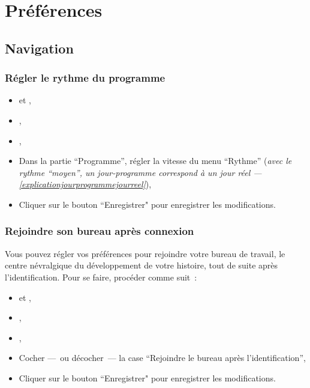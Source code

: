 \chapter{Préférences} %
\label{cha:preferences}

\section{Navigation} %
\label{sec:navigation}


\subsection{Régler le rythme du programme }
\label{sub:reglerlerythmeduprogramme}

\begin{itemize}
  \item \rejoindreLeSite{} et \seConnecter{},
  \item \rejoindreBureau{},
  \item {},
  \item Dans la partie “Programme”, régler la vitesse du menu “Rythme” ({\it avec le rythme \enquote{moyen}, un jour-programme correspond à un jour réel — \ref{explicationjourprogrammejourreel}}),
  \item Cliquer sur le bouton “Enregistrer" pour enregistrer les modifications.
\end{itemize}


\subsection{Rejoindre son bureau après connexion}
\label{rejoindresonbureauapresconnexion}

Vous pouvez régler vos préférences pour rejoindre votre bureau de travail, le centre névralgique du développement de votre histoire, tout de suite après l'identification. Pour se faire, procéder comme suit~:

\begin{itemize}
  \item \rejoindreLeSite{} et \seConnecter{},
  \item \rejoindreBureau{},
  \item {},
  \item Cocher —~ou décocher~— la case “Rejoindre le bureau après l'identification”,
  \item Cliquer sur le bouton “Enregistrer" pour enregistrer les modifications.
\end{itemize}

